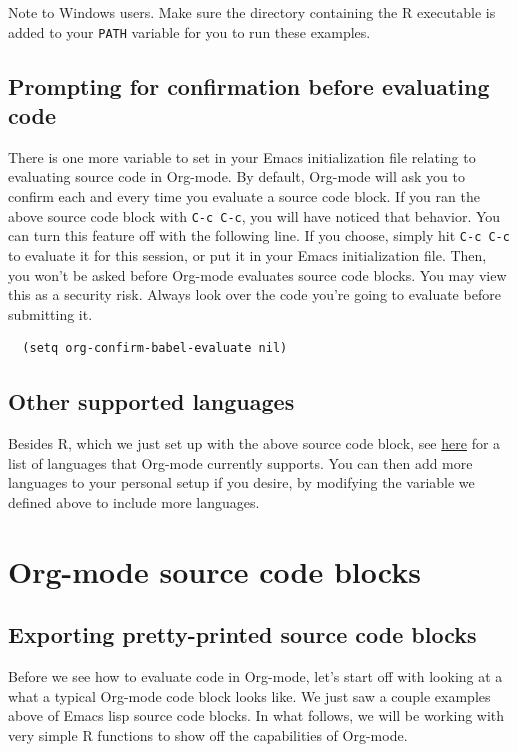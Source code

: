 \documentclass[11pt]{article}
\begin{document}
Note to Windows users. Make sure the directory containing the R executable is added to your \texttt{PATH} variable for you to run these examples.

\subsection*{Prompting for confirmation before evaluating code}
\label{sec-2-1}
There is one more variable to set in your Emacs initialization file relating to evaluating source code in Org-mode. By default, Org-mode will ask you to confirm each and every time you evaluate a source code block. If you ran the above source code block with \texttt{C-c C-c}, you will have noticed that behavior. You can turn this feature off with the following line. If you choose, simply hit \texttt{C-c C-c} to evaluate it for this session, or put it in your Emacs initialization file. Then, you won't be asked before Org-mode evaluates source code blocks. You may view this as a security risk. Always look over the code you're going to evaluate before submitting it. 

\begin{verbatim}
  (setq org-confirm-babel-evaluate nil)
\end{verbatim}
\subsection*{Other supported languages}
\label{sec-2-2}

Besides R, which we just set up with the above source code block, see \href{http://orgmode.org/manual/Languages.html#Languages}{here} for a list of languages that Org-mode currently supports. You can then add more languages to your personal setup if you desire, by modifying the variable we defined above to include more languages.
\section*{Org-mode source code blocks}
\label{sec-3}
\subsection*{Exporting pretty-printed source code blocks}
\label{sec-3-1}

Before we see how to evaluate code in Org-mode, let's start off with looking at a what a typical Org-mode code block looks like. We just saw a couple examples above of Emacs lisp source code blocks. In what follows, we will be working with very simple R functions to show off the capabilities of Org-mode.
\end{document}
